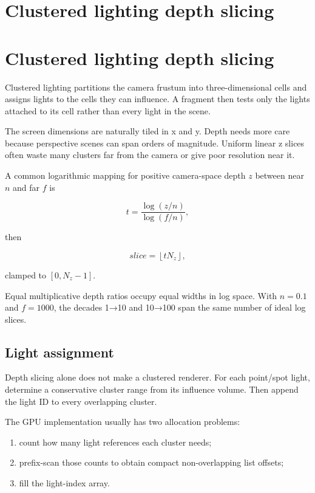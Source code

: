 \hypertarget{appendix-b0efeb3f3648}{}
\section*{Clustered lighting depth slicing}
\section{Clustered lighting depth slicing}\label{clustered-lighting-depth-slicing}

Clustered lighting partitions the camera frustum into three-dimensional cells and assigns lights to the cells they can influence. A fragment then tests only the lights attached to its cell rather than every light in the scene.

The screen dimensions are naturally tiled in x and y. Depth needs more care because perspective scenes can span orders of magnitude. Uniform linear z slices often waste many clusters far from the camera or give poor resolution near it.

A common logarithmic mapping for positive camera-space depth \(z\) between near \(n\) and far \(f\) is

\[
t=
\frac{\log(z/n)}{\log(f/n)},
\]

then

\[
slice=
\left\lfloor tN_z\right\rfloor,
\]

clamped to \([0,N_z-1]\).

Equal multiplicative depth ratios occupy equal widths in log space. With \(n=0.1\) and \(f=1000\), the decades 1→10 and 10→100 span the same number of ideal log slices.

\subsection{Light assignment}\label{light-assignment}

Depth slicing alone does not make a clustered renderer. For each point/spot light, determine a conservative cluster range from its influence volume. Then append the light ID to every overlapping cluster.

The GPU implementation usually has two allocation problems:

\begin{enumerate}
\def\labelenumi{\arabic{enumi}.}
\tightlist
\item
  count how many light references each cluster needs;
\item
  prefix-scan those counts to obtain compact non-overlapping list offsets;
\item
  fill the light-index array.
\end{enumerate}

